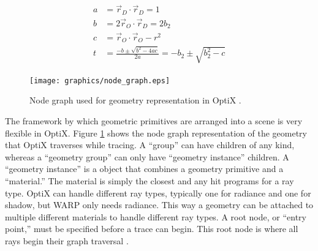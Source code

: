\begin{equation}
\label{ray_sphere}
\begin{split}
a &= \vec{r}_D \cdot \vec{r}_D = 1\\
b &= 2 \vec{r}_O \cdot \vec{r}_D = 2b_2\\
c &= \vec{r}_O \cdot \vec{r}_O - r^2 \\
t &= \frac{-b \pm \sqrt{b^2-4ac}}{2a} = -b_2 \pm \sqrt{b_2^2-c}
\end{split}
\end{equation}

 \begin{figure}[h!] 
  \centering
    \texttt{[image: graphics/node\_graph.eps]}
     \caption[Node graph used for geometry representation in OptiX.]{Node graph used for geometry representation in OptiX \cite{optix}. \label{node_graph}}
\end{figure}

The framework by which geometric primitives are arranged into a scene is very flexible in OptiX.  Figure \ref{node_graph} shows the node graph representation of the geometry that OptiX traverses while tracing.   A ``group'' can have children of any kind, whereas a ``geometry group'' can only have ``geometry instance'' children.  A ``geometry instance'' is a object that combines a geometry primitive and a ``material.''  The material is simply the closest and any hit programs for a ray type.  OptiX can handle different ray types, typically one for radiance and one for shadow, but WARP only needs radiance.  This way a geometry can be attached to multiple different materials to handle different ray types.  A root node, or ``entry point,'' must be specified before a trace can begin.  This root node is where all rays begin their graph traversal \cite{optix}.

